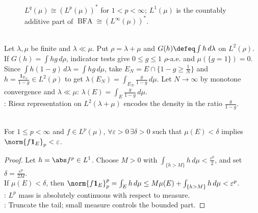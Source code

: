 \begin{figure}[H]
  \centering
  
  \caption{$L^q(\mu)\cong(L^p(\mu))^*$ for $1<p<\infty$; $L^1(\mu)$ is the countably additive part of $\operatorname{BFA}\cong(L^\infty(\mu))^*$.}
  \label{fig:lp-linfty-duality-map}
\end{figure}

\begin{remark} \label{rem:riesz-l2-route-to-radon-nikodym} \\
Let $\lambda,\mu$ be finite and $\lambda\ll\mu$. Put $\rho=\lambda+\mu$ and $G(h)\defeq\int h\,d\lambda$ on $L^2(\rho)$.\\
If $G(h)=\int hg\,d\rho$, indicator tests give $0\leq g\leq1$ $\rho$-a.e. and $\mu(\{g=1\})=0$.\\
Since $\int h(1-g)\,d\lambda=\int hg\,d\mu$, take $E_N=E\cap\{1-g\geq\frac{1}{N}\}$ and $h=\frac{\mathbf 1_{E_N}}{1-g}\in L^2(\rho)$ to get $\lambda(E_N)=\int_{E_N}\frac{g}{1-g}\,d\mu$. Let $N\to\infty$ by monotone convergence and $\lambda\ll\mu$: $\lambda(E)=\int_E \frac{g}{1-g}\,d\mu$.\\
: Riesz representation on $L^2(\lambda+\mu)$ encodes the density in the ratio $\frac{g}{1-g}$.
\end{remark}

\begin{lemma} \label{lem:lp-integral-absolute-continuity} \\
For $1\leq p<\infty$ and $f\in L^p(\mu)$, $\forall\varepsilon>0\,\exists\delta>0$ such that $\mu(E)<\delta$ implies $\norm{f\mathbf 1_E}_p<\varepsilon$.
\begin{proof}
Let $h=\abs f^p\in L^1$. Choose $M>0$ with $\int_{\{h>M\}}h\,d\mu<\frac{\varepsilon^p}{2}$, and set $\delta=\frac{\varepsilon^p}{2M}$.\\
If $\mu(E)<\delta$, then $\norm{f\mathbf 1_E}_p^p=\int_Eh\,d\mu\leq M\mu(E)+\int_{\{h>M\}}h\,d\mu<\varepsilon^p$.\\
: $L^p$ mass is absolutely continuous with respect to measure.\\
: Truncate the tail; small measure controls the bounded part.
\end{proof}
\end{lemma}


